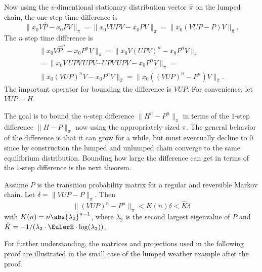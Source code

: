 \documentclass[12pt]{article}
\begin{document}
Now using the \( v \)-dimentional stationary distribution vector \(
\hat{\pi} \) on
the lumped chain,
the one step time difference is
\[
    \| x_0 V \hat{P} - x_0 P V \|_{\pi} = \| x_0 V U P V - x_0 P V \|_{\pi}
    = \| x_0 (VUP - P) V \|_{\hat{\pi}}.
\] The \( n \) step time difference is
\begin{multline*}
    \| x_0 V \hat{P}^n - x_0 P^n V \|_{\pi} = \| x_0 V (U P V)^n - x_0 P^n
    V \|_{\hat{\pi}} \\
    = \| x_0 V\,UPV\,UPV \cdots UPV\,UPV - x_0 P^n V \|_{\hat{\pi}} = \\
    \| x_0 (VUP)^{n}V - x_0 P^n V \|_{\hat{\pi}} = \| x_0 ((VUP)^n - P^n) V \|_
    {\hat{\pi}}.
\end{multline*}
The important operator for bounding the difference is \( VUP \).  For
convenience, let \( VUP = H \).

The goal is to bound the \( n \)-step difference \( \| H^n - P^n \|_{\pi}
\) in terms of the \( 1 \)-step difference \( \| H - P\|_{\pi} \) now
using the appropriately sized \( \pi \).  The
general behavior of the difference is that it can grow for a while, but
must eventually decline to \( 0 \) since by construction the lumped and
unlumped chain converge to the same equilibrium distribution.  Bounding
how large the difference can get in terms of the \( 1 \)-step difference
is the next theorem.

\begin{theorem}
    Assume \( P \) is the transition probability matrix for a regular
    and reversible Markov chain. Let \( \delta = \| VUP - P \|_{\pi} \).
    Then
    \[
        \| (VUP)^n - P^n \|_{\pi} < K(n) \delta < \hat{K} \delta
    \] with \( K(n) = n \abs{\lambda_2}^{n-1} \), where \( \lambda_2 \)
    is the second largest eigenvalue of \( P \) and \( \hat{K} = -1/(\lambda_2
    \cdot \EulerE \cdot \log(\lambda_2)) \).
\end{theorem}

\begin{remark}
For further understanding, the matrices and projections used in the following proof are
illustrated in the small case of the lumped weather example after the
proof. 
\end{remark}
\end{document}
